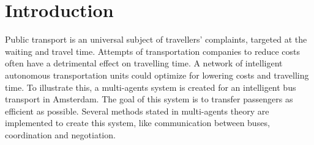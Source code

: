 \section{Introduction}

Public transport is an universal subject of travellers' complaints, targeted at the waiting and travel time. Attempts of transportation companies to reduce costs often have a detrimental effect on travelling time. A network of intelligent autonomous transportation units could optimize for lowering costs and travelling time. To illustrate this, a multi-agents system is created for an intelligent bus transport in Amsterdam. The goal of this system is to transfer passengers as efficient as possible. Several methods stated in multi-agents theory \cite{intromultiagentsystems} are implemented to create this system, like communication between buses, coordination and negotiation. 
